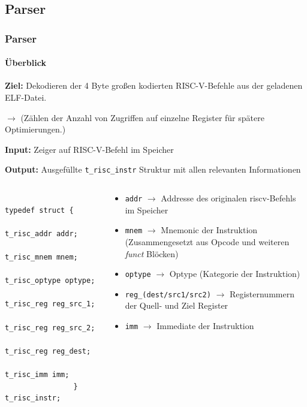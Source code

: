\documentclass[german]{tum-presentation}
\newcommand{\refer}[0]{\ensuremath{\rightarrow} }
\begin{document}
\subsection{Parser} %
\begin{frame}[fragile]
	\frametitle{Parser}
	\framesubtitle{Überblick}
	\textbf{Ziel:} Dekodieren der 4 Byte großen kodierten RISC-V-Befehle aus der geladenen ELF-Datei.

	\refer (Zählen der Anzahl von Zugriffen auf einzelne Register für spätere Optimierungen.)

	\vspace{0.25cm}
	\textbf{Input:} Zeiger auf RISC-V-Befehl im Speicher

	\textbf{Output:} Ausgefüllte \verb!t_risc_instr! Struktur mit allen relevanten Informationen
	
	\pause

	\begin{columns}
		\begin{column}{0.4\textwidth}
			\begin{lstlisting}
				typedef struct {
				    t_risc_addr addr;
				    t_risc_mnem mnem;
				    t_risc_optype optype;
				    t_risc_reg reg_src_1;
				    t_risc_reg reg_src_2;
				    t_risc_reg reg_dest;
				    t_risc_imm imm;
				} t_risc_instr;
			\end{lstlisting}
		\end{column}
		\begin{column}{0.6\textwidth}
			\vspace{0.25cm}
			\begin{itemize}
				\item \verb!addr! \refer Addresse des originalen riscv-Befehls im Speicher				
				\item \verb!mnem! \refer Mnemonic der Instruktion (Zusammengesetzt aus Opcode und weiteren \textit{funct} Blöcken)
				\item \verb!optype! \refer Optype (Kategorie der Instruktion)
				\item \verb!reg_(dest/src1/src2)! \refer Registernummern der Quell- und Ziel Register
				\item \verb!imm! \refer Immediate der Instruktion
			\end{itemize}
		\end{column}
	\end{columns}


\end{frame}
\end{document}
